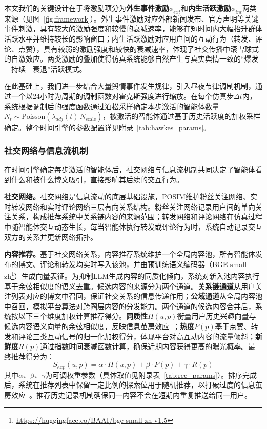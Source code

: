 \documentclass[a4paper,fleqn]{cas-dc}
\begin{document}
本文我们的关键设计在于将激励项分为\textbf{外生事件激励}$\phi_{ext}$和\textbf{内生活跃激励}$\phi_{int}$两类来源（见图~\ref{fig:framework}）。外生事件激励对应外部新闻发布、官方声明等关键事件刺激，具有较大的激励强度和较慢的衰减速率，能够在短时间内大幅抬升群体活跃水平并维持较长的影响窗口；内生活跃激励对应用户间的互动行为（转发、评论、点赞），具有较弱的激励强度和较快的衰减速率，体现了社交传播中滚雪球式的自激效应。两类激励的叠加使得仿真系统能够自然产生与真实舆情一致的“爆发—持续—衰退”活跃模式。

在此基础上，我们进一步结合大量舆情事件发生规律，引入昼夜节律调制机制，通过一个以24小时为周期的调制函数对霍克斯强度进行缩放。在每个仿真步$\Delta t$内，系统根据调制后的强度函数通过泊松采样确定本步激活的智能体数量$N_t \sim \text{Poisson}(\lambda_{adj}(t)\, N_{\text{scale}})$，被激活的智能体通过基于历史活跃度的加权采样确定。整个时间引擎的参数配置详见附录~\ref{tab:hawkes_params}。

\subsubsection{社交网络与信息流机制}

在时间引擎确定每步激活的智能体后，社交网络与信息流机制共同决定了智能体看到什么和被什么博文吸引，直接影响其后续的交互行为。

\textbf{社交网络。}社交网络是信息流动的底层基础设施，POSIM维护粉丝关注网络、实时转发网络和实时评论网络三层有向关系结构。粉丝关注网络记录用户间的单向关注关系，构成推荐系统中关系链内容的来源范围；转发网络和评论网络在仿真过程中随智能体交互动态生长，每当智能体执行转发或评论行为时，系统自动记录交互双方的关系并更新网络拓扑。

\textbf{内容推荐。}基于社交网络关系，内容推荐系统维护一个全局内容池，所有智能体发布的博文、评论和转发均实时写入该池，并由预训练语义编码器（BGE-small-zh\footnote{\url{https://huggingface.co/BAAI/bge-small-zh-v1.5}}）生成向量表征。为抑制LLM生成内容的同质化倾向，系统对新入池内容执行基于余弦相似度的语义去重。候选内容的来源分为两个通道。\textbf{关系链通道}从用户关注列表对应的博文中召回，保证社交关系的信息传递作用；\textbf{公域通道}从全局内容池中召回，模拟平台算法对跨圈层内容的分发能力。两个通道的候选内容合并后，系统按以下三个维度加权计算推荐得分。\textbf{同质性}$H(u,p)$衡量用户历史兴趣向量与候选内容语义向量的余弦相似度，反映信息茧房效应~\citep{cinelli_echo_2021}；\textbf{热度}$P(p)$基于点赞、转发和评论三类互动信号的归一化加权得分，体现平台对高互动内容的流量倾斜；\textbf{新鲜度}$R(p)$通过指数时间衰减函数计算，确保近期内容获得更高的曝光概率。最终推荐得分为：
\begin{equation}
S_{exp}(u, p) = \alpha \cdot H(u, p) + \beta \cdot P(p) + \gamma \cdot R(p)
\label{eq:recommend}
\end{equation}
其中$\alpha$、$\beta$、$\gamma$为可调权重参数（具体取值见附录表~\ref{tab:rec_params}）。排序完成后，系统在推荐列表中保留一定比例的探索位用于随机推荐，以打破过度的信息茧房效应~\citep{bail_opposing_2018}。推荐历史记录机制确保同一内容不会在短期内重复推送给同一用户。
\end{document}
